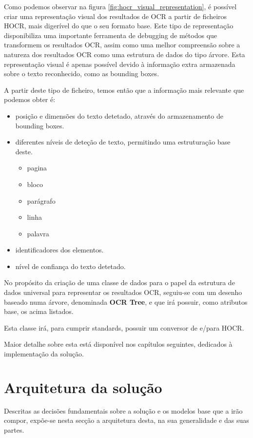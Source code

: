 Como podemos observar na figura \ref{fig:hocr_visual_representation}, é possível criar uma representação visual dos resultados de OCR a partir de ficheiros HOCR, mais digerível do que o seu formato base. Este tipo de representação disponibiliza uma importante ferramenta de debugging de métodos que transformem os resultados OCR, assim como uma melhor compreensão sobre a natureza dos resultados OCR como uma estrutura de dados do tipo árvore. Esta representação visual é apenas possível devido à informação extra armazenada sobre o texto reconhecido, como as bounding boxes.

A partir deste tipo de ficheiro, temos então que a informação mais relevante que podemos obter é:

\begin{itemize}\setlength\itemsep{-0.8em}
	\item posição e dimensões do texto detetado, através do armazenamento de bounding boxes.
	\item diferentes níveis de deteção de texto, permitindo uma estruturação base deste.
		\begin{itemize}\setlength\itemsep{-0.8em}
			\item pagina
			\item bloco
			\item parágrafo
			\item linha
			\item palavra
		\end{itemize}
	\item identificadores dos elementos.
	\item nível de confiança do texto detetado.
\end{itemize}

No propósito da criação de uma classe de dados para o papel da estrutura de dados universal para representar os resultados OCR, seguiu-se com um desenho baseado numa árvore, denominada \textbf{OCR Tree}, e que irá possuir, como atributos base, os acima listados.

Esta classe irá, para cumprir standards, possuir um conversor de e/para HOCR. 

Maior detalhe sobre esta está disponível nos capítulos seguintes, dedicados à implementação da solução.


\section{Arquitetura da solução}

Descritas as decisões fundamentais sobre a solução e os modelos base que a irão compor, expõe-se nesta secção a arquitetura desta, na sua generalidade e das suas partes.

